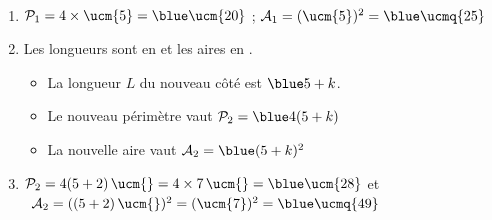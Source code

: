    \ \\ [-5mm]
   \begin{enumerate}
      \item $\mathcal{P}_1 =4\times\ucm{5} =\blue\ucm{20}$ ; $\mathcal{A}_1 =(\ucm{5})^2 =\blue\ucmq{25}$
      \item Les longueurs sont en \ucm{} et les aires en \ucmq{}.
      \begin{itemize}
         \item La longueur $L$ du nouveau côté est $\blue5+k$.
         \item Le nouveau périmètre vaut $\mathcal{P}_2 =\blue4(5+k)$
         \item La nouvelle aire vaut $\mathcal{A}_2 =\blue(5+k)^2$
      \end{itemize}
   \end{enumerate}

\Coupe

   \begin{enumerate}
   \setcounter{enumi}{2}
      \item $\mathcal{P}_2 =4(5+2) \, \ucm{} = 4\times7 \, \ucm{} =\blue\ucm{28}$ et \\
      \quad\, $\mathcal{A}_2 =((5+2)\,\ucm{})^2 =(\ucm{7})^2 =\blue\ucmq{49}$
   \end{enumerate}
